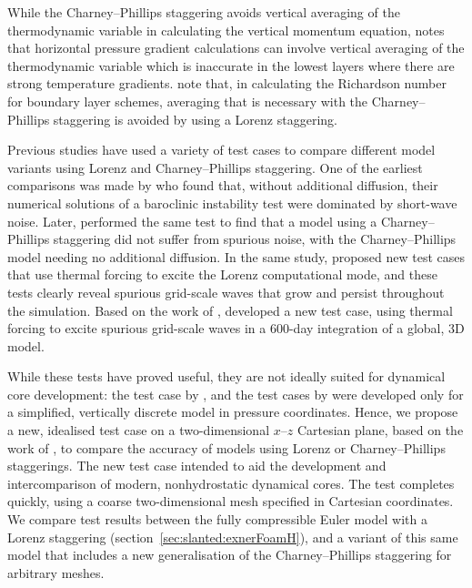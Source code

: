 While the Charney--Phillips staggering avoids vertical averaging of the thermodynamic variable in calculating the vertical momentum equation, \citet{davies2005} notes that horizontal pressure gradient calculations can involve vertical averaging of the thermodynamic variable which is inaccurate in the lowest layers where there are strong temperature gradients.
\citet{holdaway2013a} note that, in calculating the Richardson number for boundary layer schemes, averaging that is necessary with the Charney--Phillips staggering is avoided by using a Lorenz staggering.

Previous studies have used a variety of test cases to compare different model variants using Lorenz and Charney--Phillips staggering.
One of the earliest comparisons was made by \citet{arakawa-moorthi1988} who found that, without additional diffusion, their numerical solutions of a baroclinic instability test were dominated by short-wave noise.
Later, \citet{arakawa-konor1996} performed the same test to find that a model using a Charney--Phillips staggering did not suffer from spurious noise, with the Charney--Phillips model needing no additional diffusion.
In the same study, \citet{arakawa-konor1996} proposed new test cases that use thermal forcing to excite the Lorenz computational mode, and these tests clearly reveal spurious grid-scale waves that grow and persist throughout the simulation.
Based on the work of \citet{arakawa-konor1996}, \citet{untch-hortal2004} developed a new test case, using thermal forcing to excite spurious grid-scale waves in a 600-day integration of a global, 3D model.

While these tests have proved useful, they are not ideally suited for dynamical core development: the test case by \citet{untch-hortal2004} , and the test cases by \citet{arakawa-konor1996} were developed only for a simplified, vertically discrete model in pressure coordinates.
Hence, we propose a new, idealised test case on a two-dimensional $x$--$z$ Cartesian plane, based on the work of \citet{arakawa-konor1996}, to compare the accuracy of models using Lorenz or Charney--Phillips staggerings.
The new test case intended to aid the development and intercomparison of modern, nonhydrostatic dynamical cores.  The test completes quickly, using a coarse two-dimensional mesh specified in Cartesian coordinates.
We compare test results between the fully compressible Euler model with a Lorenz staggering (section~\ref{sec:slanted:exnerFoamH}), and a variant of this same model that includes a new generalisation of the Charney--Phillips staggering for arbitrary meshes.


